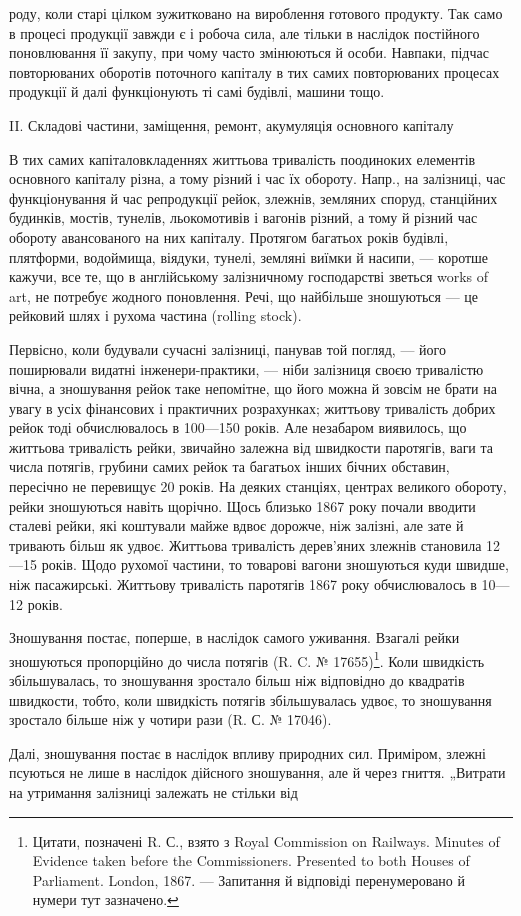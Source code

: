 роду, коли старі цілком зужитковано на вироблення готового продукту. Так само в процесі продукції
завжди є і робоча сила, але тільки в наслідок постійного поновлювання її закупу, при чому часто
змінюються й особи. Навпаки, підчас повторюваних оборотів поточного капіталу в тих самих
повторюваних процесах продукції й далі функціонують ті самі будівлі, машини тощо.

II. Складові частини, заміщення, ремонт, акумуляція основного капіталу

В тих самих капіталовкладеннях життьова тривалість поодиноких елементів основного капіталу різна, а
тому різний і час їх обороту. Напр., на залізниці, час функціонування й час репродукції рейок,
злежнів, земляних споруд, станційних будинків, мостів, тунелів, льокомотивів і вагонів різний, а
тому й різний час обороту авансованого на них капіталу. Протягом багатьох років будівлі, плятформи,
водоймища, віядуки, тунелі,
земляні виїмки й насипи, — коротше кажучи, все те, що в англійському залізничному господарстві
зветься works of art, не потребує жодного поновлення. Речі, що найбільше зношуються — це рейковий
шлях і рухома частина (rolling stock).

Первісно, коли будували сучасні залізниці, панував той погляд, — його поширювали видатні
інженери-практики, — ніби залізниця своєю тривалістю вічна, а зношування рейок таке непомітне, що
його можна й зовсім не брати на увагу в усіх фінансових і практичних розрахунках; життьову
тривалість добрих рейок тоді обчислювалось в 100—150 років. Але незабаром виявилось, що життьова
тривалість рейки, звичайно залежна від швидкости паротягів, ваги та числа потягів, грубини самих
рейок та багатьох інших бічних обставин, пересічно не перевищує 20 років.
На деяких станціях, центрах великого обороту, рейки зношуються навіть щорічно. Щось близько 1867
року почали вводити сталеві рейки, які коштували майже вдвоє дорожче, ніж залізні, але зате й
тривають більш як удвоє. Життьова тривалість дерев’яних злежнів становила 12—15 років. Щодо рухомої
частини, то товарові вагони зношуються куди швидше, ніж пасажирські. Життьову тривалість паротягів
1867 року обчислювалось в 10—12 років.

Зношування постає, поперше, в наслідок самого уживання. Взагалі рейки зношуються пропорційно до
числа потягів (R. C. № 17655)\footnote{
Цитати, позначені R. С., взято з Royal Commission on Railways. Minutes of Evidence taken before
the Commissioners. Presented to both Houses of Parliament. London, 1867. — Запитання й відповіді
перенумеровано й нумери тут зазначено.
}. Коли швидкість збільшувалась, то зношування зростало більш ніж
відповідно до квадратів швидкости, тобто, коли швидкість потягів збільшувалась удвоє, то зношування
зростало більше ніж у чотири рази (R. С. № 17046).

Далі, зношування постає в наслідок впливу природних сил. Приміром, злежні псуються не лише в
наслідок дійсного зношування, але й через гниття. „Витрати на утримання залізниці залежать не
стільки від